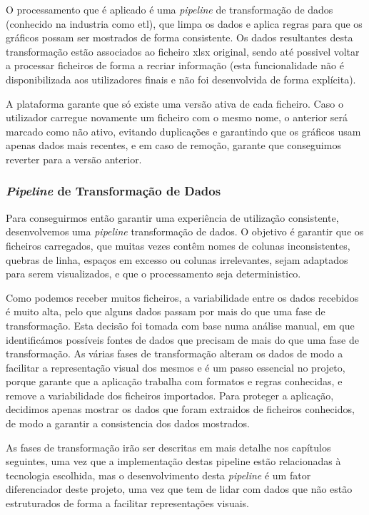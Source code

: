 O processamento que é aplicado é uma \textit{pipeline} de transformação de dados (conhecido na industria como \gls{etl}), que limpa os dados e aplica regras para que os gráficos possam ser mostrados de forma consistente. Os dados resultantes desta transformação estão associados ao ficheiro \gls{xlsx} original, sendo até possivel voltar a processar ficheiros de forma a recriar informação (esta funcionalidade não é disponibilizada aos utilizadores finais e não foi desenvolvida de forma explícita).

A plataforma garante que só existe uma versão ativa de cada ficheiro. Caso o utilizador carregue novamente um ficheiro com o mesmo nome, o anterior será marcado como não ativo, evitando duplicações e garantindo que os gráficos usam apenas dados mais recentes, e em caso de remoção, garante que conseguimos reverter para a versão anterior.

\subsubsection{\textit{Pipeline} de Transformação de Dados}

Para conseguirmos então garantir uma experiência de utilização consistente, desenvolvemos uma \textit{pipeline} transformação de dados. O objetivo é garantir que os ficheiros carregados, que muitas vezes contêm nomes de colunas inconsistentes, quebras de linha, espaços em excesso ou colunas irrelevantes, sejam adaptados para serem visualizados, e que o processamento seja deterministico.

Como podemos receber muitos ficheiros, a variabilidade entre os dados recebidos é muito alta, pelo que alguns dados passam por mais do que uma fase de transformação. Esta decisão foi tomada com base numa análise manual, em que identificámos possíveis fontes de dados que precisam de mais do que uma fase de transformação. As várias fases de transformação alteram os dados de modo a facilitar a representação visual dos mesmos e é um passo essencial no projeto, porque garante que a aplicação trabalha com formatos e regras conhecidas, e remove a variabilidade dos ficheiros importados. Para proteger a aplicação, decidimos apenas mostrar os dados que foram extraidos de ficheiros conhecidos, de modo a garantir a consistencia dos dados mostrados.

As fases de transformação irão ser descritas em mais detalhe nos capítulos seguintes, uma vez que a implementação destas pipeline estão relacionadas à tecnologia escolhida, mas o desenvolvimento desta \textit{pipeline} é um fator diferenciador deste projeto, uma vez que tem de lidar com dados que não estão estruturados de forma a facilitar representações visuais. 

